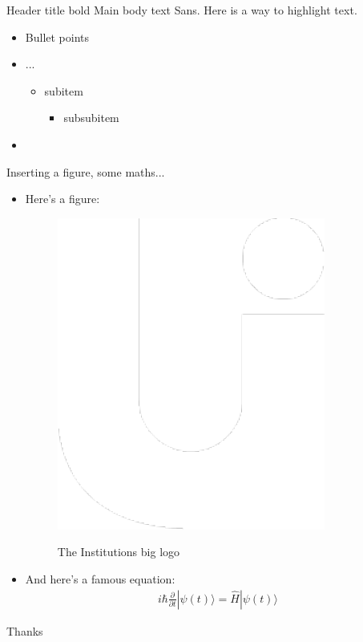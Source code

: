 \documentclass{beamer}
\begin{document}
\begin{frame}[t]{Header title bold}
	Main body text Sans. Here is a way to \alert{highlight text}.
	\label{sec:Test1}
	\begin{itemize}
		\item Bullet points
		\item ...
			\begin{itemize}
				\item subitem
					\begin{itemize}
						\item subsubitem
					\end{itemize}
			\end{itemize}
		\item \lipsum[2]
	\end{itemize}
\end{frame}


\begin{frame}{Inserting a figure, some maths...}
\begin{itemize}
    \item   Here's a figure:
    \begin{figure}[h]
        \centering
        \colorbox{slideBlue}{\includegraphics[width=.13\linewidth]{./assets/img/logo}}
        \caption{The Institutions big logo}
        \label{fig:big-u}
    \end{figure}
    \item 
    And here's a famous equation:
    \begin{eqnarray}
        \label{eq:schroedinger}
        i\hbar {\frac {\partial }{\partial t}}|\psi (t)\rangle =%
        {\hat {H}}|\psi (t)\rangle
    \end{eqnarray}
\end{itemize}
\end{frame}



\begin{frame}
\begin{center}
    {\fontsize{120}{72}\selectfont Thanks}
\end{center}
\end{frame}
\end{document}
